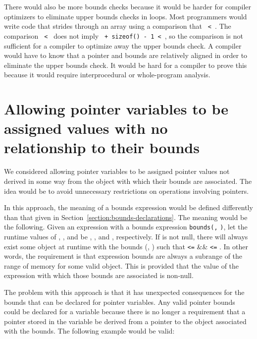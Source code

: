 There would also be more bounds checks because it would be harder for compiler optimizers
to eliminate upper bounds checks in loops.  Most programmers would write code that
strides through an array using a comparison that
\texttt{ \textless{} }. The comparison 
\texttt{ < } does not imply
\texttt{ + sizeof() - 1 < }, so the comparison is
not sufficient for a compiler to optimize away
the upper bounds check. A compiler would have to know that a pointer
and bounds are relatively aligned in order to eliminate the upper bounds
check. It would be hard for a compiler to prove this because it would
require interprocedural or whole-program analysis.

\section{Allowing pointer variables to be assigned values with no relationship to their bounds}

We considered allowing pointer variables to be assigned pointer values
not derived in some way from the object with which their bounds are
associated. The idea would be to avoid unnecessary restrictions on
operations involving pointers.

In this approach, the meaning of a bounds expression would be defined
differently than that given in Section~\ref{section:bounds-declarations}. 
The meaning would be the
following. Given an expression  with a bounds expression
\texttt{bounds(}\texttt{,} \texttt{)}, let the runtime
values of , , and  be , ,
and , respectively. If  is not null, there will
always exist some object at runtime with the bounds (,
) such that  \texttt{\textless{}=}  \&\&
 \texttt{\textless{}=} . In other words, the
requirement is that expression bounds are always a subrange of the range
of memory for some valid object. This is provided that the value of the
expression with which those bounds are associated is non-null.

The problem with this approach is that it has unexpected consequences
for the bounds that can be declared for pointer variables.
Any valid pointer bounds could be declared for a variable because there
is no longer a requirement that a pointer stored in the variable be
derived from a pointer to the object associated with the bounds. The
following example would be valid:


